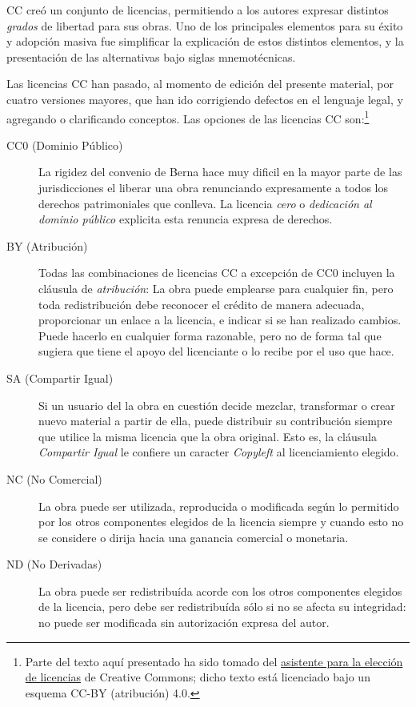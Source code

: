 \documentclass[11pt,fleqn]{book} %
\begin{document}
\textsc{CC} creó un conjunto de licencias, permitiendo a los autores
expresar distintos \emph{grados} de libertad para sus obras. Uno de los
principales elementos para su éxito y adopción masiva fue simplificar
la explicación de estos distintos elementos, y la presentación de las
alternativas bajo siglas mnemotécnicas.

Las licencias \textsc{CC} han pasado, al momento de edición del
presente material, por cuatro versiones mayores, que han ido
corrigiendo defectos en el lenguaje legal, y agregando o clarificando
conceptos. Las opciones de las licencias \textsc{CC} son:\footnote{Parte del
texto aquí presentado ha sido tomado del \href{https://creativecommons.org/choose/?lang=es}{asistente para la elección de licencias} de Creative Commons; dicho texto está licenciado bajo un
esquema CC-BY (atribución) 4.0. }

\begin{description}
\item[CC0 (Dominio Público)] La rigidez del convenio de Berna hace muy
     dificil en la mayor parte de las jurisdicciones el liberar una
     obra renunciando expresamente a todos los derechos patrimoniales
     que conlleva. La licencia \emph{cero} o \emph{dedicación al dominio      público} explicita esta renuncia expresa de derechos.
\item[BY (Atribución)] Todas las combinaciones de licencias \textsc{CC}
     a excepción de CC0 incluyen la cláusula de \emph{atribución}: La obra
     puede emplearse para cualquier fin, pero toda redistribución debe
     reconocer el crédito de manera adecuada, proporcionar un enlace a
     la licencia, e indicar si se han realizado cambios. Puede hacerlo
     en cualquier forma razonable, pero no de forma tal que sugiera
     que tiene el apoyo del licenciante o lo recibe por el uso que
     hace.
\item[SA (Compartir Igual)] Si un usuario del la obra en cuestión decide
     mezclar, transformar o crear nuevo material a partir de ella,
     puede distribuir su contribución siempre que utilice la misma
     licencia que la obra original. Esto es, la cláusula \emph{Compartir      Igual} le confiere un caracter \emph{Copyleft} al licenciamiento
     elegido.
\item[NC (No Comercial)] La obra puede ser utilizada, reproducida o
     modificada según lo permitido por los otros componentes elegidos
     de la licencia siempre y cuando esto no se considere o dirija
     hacia una ganancia comercial o monetaria.
\item[ND (No Derivadas)] La obra puede ser redistribuída acorde con los
     otros componentes elegidos de la licencia, pero debe ser
     redistribuída sólo si no se afecta su integridad: no puede ser
     modificada sin autorización expresa del autor.
\end{description}
\end{document}
